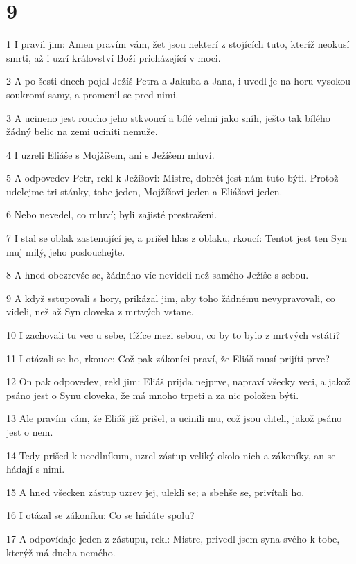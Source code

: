 \chapter{9}

\par 1 I pravil jim: Amen pravím vám, žet jsou nekterí z stojících tuto, kteríž neokusí smrti, až i uzrí království Boží pricházející v moci.
\par 2 A po šesti dnech pojal Ježíš Petra a Jakuba a Jana, i uvedl je na horu vysokou soukromí samy, a promenil se pred nimi.
\par 3 A ucineno jest roucho jeho stkvoucí a bílé velmi jako sníh, ješto tak bílého žádný belic na zemi uciniti nemuže.
\par 4 I uzreli Eliáše s Mojžíšem, ani s Ježíšem mluví.
\par 5 A odpovedev Petr, rekl k Ježíšovi: Mistre, dobrét jest nám tuto býti. Protož udelejme tri stánky, tobe jeden, Mojžíšovi jeden a Eliášovi jeden.
\par 6 Nebo nevedel, co mluví; byli zajisté prestrašeni.
\par 7 I stal se oblak zastenující je, a prišel hlas z oblaku, rkoucí: Tentot jest ten Syn muj milý, jeho poslouchejte.
\par 8 A hned obezrevše se, žádného víc nevideli než samého Ježíše s sebou.
\par 9 A když sstupovali s hory, prikázal jim, aby toho žádnému nevypravovali, co videli, než až Syn cloveka z mrtvých vstane.
\par 10 I zachovali tu vec u sebe, tížíce mezi sebou, co by to bylo z mrtvých vstáti?
\par 11 I otázali se ho, rkouce: Což pak zákoníci praví, že Eliáš musí prijíti prve?
\par 12 On pak odpovedev, rekl jim: Eliáš prijda nejprve, napraví všecky veci, a jakož psáno jest o Synu cloveka, že má mnoho trpeti a za nic položen býti.
\par 13 Ale pravím vám, že Eliáš již prišel, a ucinili mu, což jsou chteli, jakož psáno jest o nem.
\par 14 Tedy prišed k ucedlníkum, uzrel zástup veliký okolo nich a zákoníky, an se hádají s nimi.
\par 15 A hned všecken zástup uzrev jej, ulekli se; a sbehše se, privítali ho.
\par 16 I otázal se zákoníku: Co se hádáte spolu?
\par 17 A odpovídaje jeden z zástupu, rekl: Mistre, privedl jsem syna svého k tobe, kterýž má ducha nemého.
